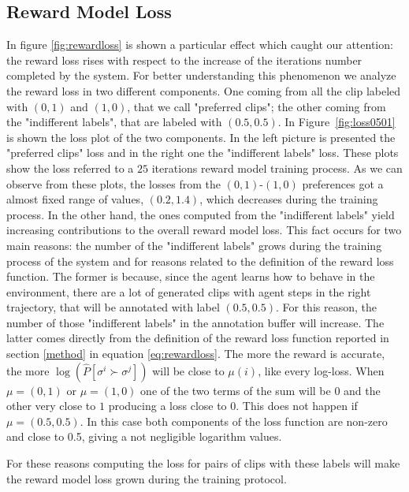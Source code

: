 \subsection{Reward Model Loss}
In figure \ref{fig:rewardloss} is shown a particular effect which caught our attention: the reward loss rises with respect to the increase of the iterations number completed by the system. 
For better understanding this phenomenon we analyze the reward loss in two different components. One coming from all the clip labeled with $(0,1)$ and $(1,0)$, that we call "preferred clips"; the other coming from the "indifferent labels", that are labeled with $(0.5,0.5)$. In Figure\ \ref{fig:loss0501} is shown the loss plot of the two components. In the left picture is presented the "preferred clips" loss and in the right one the "indifferent labels" loss.
These plots show the loss referred to a $25$ iterations reward model training process. 
As we can observe from these plots, the losses from the $(0,1)$-$(1,0)$ preferences got a almost fixed range of values, $(0.2,1.4)$, which decreases during the training process. In the other hand, the ones computed from the "indifferent labels" yield increasing contributions to the overall reward model loss. 
This fact occurs for two main reasons: the number of the "indifferent labels" grows during the training process of the system and for reasons related to the definition of the reward loss function. 
The former is because, since the agent learns how to behave in the environment, there are a lot of generated clips with agent steps in the right trajectory, that will be annotated with label $(0.5,0.5)$. For this reason, the number of those "indifferent labels" in the annotation buffer will increase.
The latter comes directly from the definition of the reward loss function reported in section \ref{method} in equation \ref{eq:rewardloss}. The more the reward is accurate, the more $\log(\hat{P}[\sigma^i \succ \sigma^j])$ will be close to $\mu(i)$, like every log-loss. When $\mu=(0,1)$ or $\mu=(1,0)$ one of the two terms of the sum will be 0 and the other very close to $1$ producing a loss close to $0$. This does not happen if $\mu=(0.5,0.5)$. In this case both components of the loss function are non-zero and close to 0.5, giving a not negligible logarithm values.

For these reasons computing the loss for pairs of clips with these labels will make the reward model loss grown during the training protocol. 



